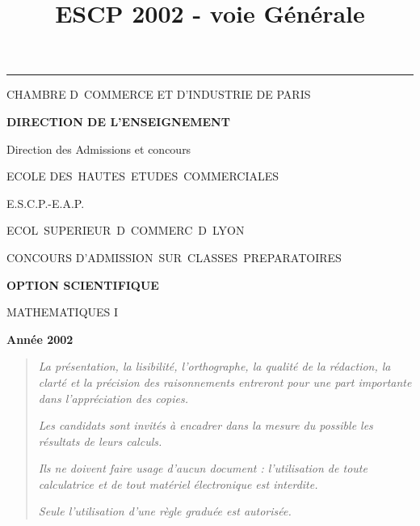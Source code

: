 \documentclass[11pt]{article}%
\title{\bf \vspace{-2cm} ESCP 2002 - voie Générale} %
\author{} %
\date{} %
\begin{document}
\maketitle %
\vspace{-1.4cm}\hrule %
\thispagestyle{fancy}

\vspace*{.2cm}




\begin{center}
{\small CHAMBRE D\E\ COMMERCE ET D'INDUSTRIE DE PARIS}

\textbf{DIRECTION DE L'ENSEIGNEMENT}

Direction des Admissions et concours

\underline{\hspace*{3cm}}

{\Large ECOLE DES\ HAUTES\ ETUDES\ COMMERCIALES}

{\Large E.S.C.P.-E.A.P.}

{\Large ECOL\E\ SUPERIEUR\E\ D\E\ COMMERC\E\ D\E\ LYON}{\large }

CONCOURS D'ADMISSION\ SUR\ CLASSES\ PREPARATOIRES

\underline{\hspace*{3cm}}

\textbf{OPTION SCIENTIFIQUE}

{\Large MATHEMATIQUES I}

\textbf{Année 2002}

\underline{\hspace*{3cm}}
\end{center}

\begin{quotation}
\noindent \textsl{La présentation, la lisibilité, l'orthographe, la
qualité
de la rédaction, la clarté et la précision des raisonnements entreront
pour
une part importante dans l'appréciation des copies.}

\noindent \textsl{Les candidats sont invités à encadrer dans la mesure
du
possible les résultats de leurs calculs.}

\noindent \textsl{Ils ne doivent faire usage d'aucun document :
l'utilisation de toute calculatrice et de tout matériel électronique
est
interdite.}

\noindent \textsl{Seule l'utilisation d'une règle graduée est
autorisée.}

\noindent \textsl{\hrulefill }
\end{quotation}
\end{document}
